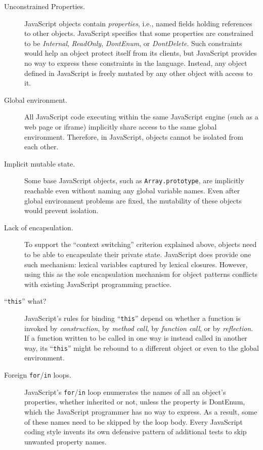 \documentclass[letterpaper,twocolumn,10pt]{article}
\newcommand{\code}[1]{{\tt {#1}}}              %
\begin{document}
\begin{description}

  \item[Unconstrained Properties.] JavaScript objects contain 
  \emph{properties}, i.e., named fields holding references to other objects. 
  JavaScript specifies that some properties are constrained to be 
  \emph{Internal}, \emph{ReadOnly}, \emph{DontEnum}, or \emph{DontDelete}. 
  Such constraints would help an object protect itself from its clients, but 
  JavaScript provides no way to express these constraints in the language. 
  Instead, any object defined in JavaScript is freely mutated by any other 
  object with access to it.
  
  \item[Global environment.] All JavaScript code executing within the same 
  JavaScript engine (such as a web page or iframe) implicitly share access to 
  the same global environment. Therefore, in JavaScript, objects cannot be 
  isolated from each other.

  \item[Implicit mutable state.] Some base JavaScript objects, such as 
  \code{Array.prototype}, are implicitly reachable even without naming any 
  global variable names. Even after global environment problems are fixed, 
  the mutability of these objects would prevent isolation.

  \item[Lack of encapsulation.] To support the ``context switching'' 
  criterion explained above, objects need to be able to encapsulate their 
  private state. JavaScript does provide one such mechanism: lexical 
  variables captured by lexical closures. However, using this as the sole 
  encapsulation mechanism for object patterns conflicts with existing 
  JavaScript programming practice.

  \item[``\code{this}'' what?] JavaScript's rules for binding ``\code{this}'' 
  depend on whether a function is invoked by \emph{construction}, by 
  \emph{method call}, by \emph{function call}, or by \emph{reflection}. If a 
  function written to be called in one way is instead called in another way, 
  its ``\code{this}'' might be rebound to a different object or even to the 
  global environment.

  \item[Foreign \code{for}/\code{in} loops.] JavaScript's 
  \code{for}/\code{in} loop enumerates the names of all an object's 
  properties, whether inherited or not, unless the property is DontEnum, 
  which the JavaScript programmer has no way to express. As a result, some of 
  these names need to be skipped by the loop body. Every JavaScript coding 
  style invents its own defensive pattern of additional tests to skip 
  unwanted property names.
    

\end{description}
\end{document}
